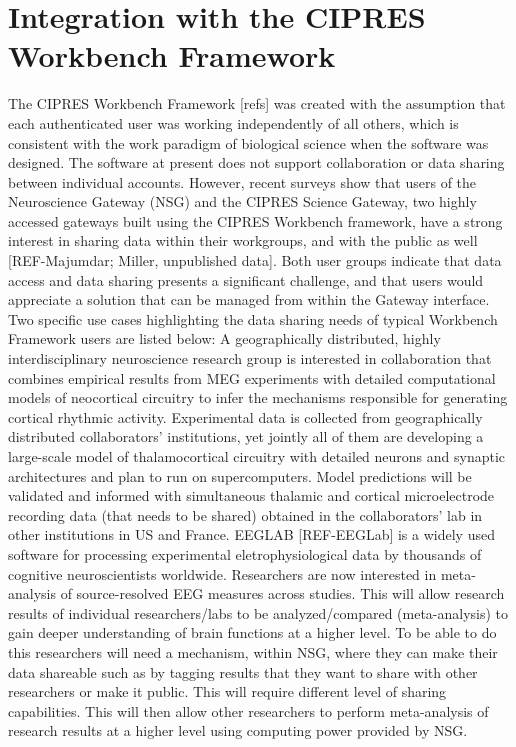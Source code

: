 \documentclass[sigconf]{acmart}
\begin{document}
\section{Integration with the CIPRES Workbench Framework}

The CIPRES Workbench Framework [refs] was created with the assumption that each authenticated user was working independently of all others, which is consistent with the work paradigm of biological science when the software was designed. The software at present does not support collaboration or data sharing between individual accounts. However, recent surveys show that users of the Neuroscience Gateway (NSG) and the CIPRES Science Gateway, two highly accessed gateways built using the CIPRES Workbench framework, have a strong interest in sharing data within their workgroups, and with the public as well [REF-Majumdar; Miller, unpublished data]. Both user groups indicate that data access and data sharing presents a significant challenge, and that users would appreciate a solution that can be managed from within the Gateway interface. Two specific use cases highlighting the data sharing needs of typical Workbench Framework users  are listed below:
A geographically distributed, highly interdisciplinary neuroscience research group is interested in collaboration that combines empirical results from MEG experiments with detailed computational models of neocortical circuitry to infer the mechanisms responsible for generating cortical rhythmic activity. Experimental data is collected from geographically distributed collaborators' institutions, yet jointly all of them are developing a large-scale model of thalamocortical circuitry with detailed neurons and synaptic architectures and plan to run on supercomputers. Model predictions will be validated and informed with simultaneous thalamic and cortical microelectrode recording data (that needs to be shared) obtained in the collaborators' lab in other institutions in US and France.
EEGLAB [REF-EEGLab] is a widely used software for processing experimental eletrophysiological data by thousands of cognitive neuroscientists worldwide. Researchers are now interested in meta-analysis of source-resolved EEG measures across studies. This will allow research results of individual researchers/labs to be analyzed/compared (meta-analysis) to gain deeper understanding of brain functions at a higher level. To be able to do this researchers will need a mechanism, within NSG, where they can make their data shareable such as by tagging results that they want to share with other researchers or make it public. This will require different level of sharing capabilities. This will then allow other researchers to perform meta-analysis of research results at a higher level using computing power provided by NSG.
\end{document}
